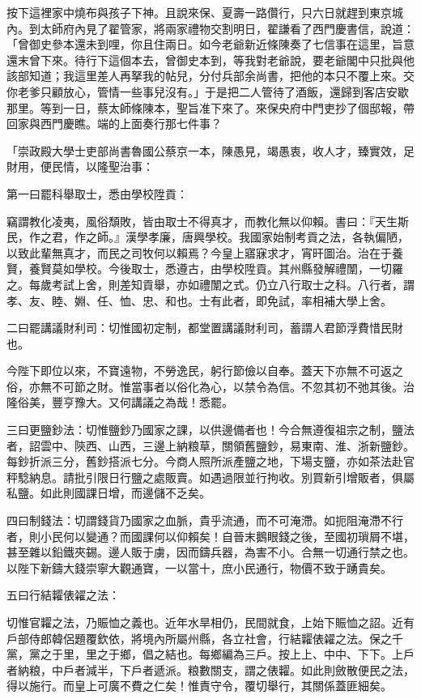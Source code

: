 \begin{showcontents}{}
按下這裡家中燒布與孩子下神。且說來保、夏壽一路儹行，只六日就趕到東京城內。到太師府內見了翟管家，將兩家禮物交割明日，翟謙看了西門慶書信，說道：「曾御史參本還未到哩，你且住兩日。如今老爺新近條陳奏了七信事在這里，旨意還末曾下來。待行下這個本去，曾御史本到，等我對老爺說，要老爺閣中只批與他該部知道；我這里差人再拏我的帖兒，分付兵部余尚書，把他的本只不覆上來。交你老爹只顧放心，管情一些事兒沒有。」于是把二人管待了酒飯，還歸到客店安歇那里。等到一日，蔡太師條陳本，聖旨准下來了。來保央府中門吏抄了個邸報，帶回家與西門慶瞧。端的上面奏行那七件事？

「崇政殿大學士吏部尚書魯國公蔡京一本，陳愚見，竭愚衷，收人才，臻實效，足財用，便民情，以隆聖治事：

第一曰罷科舉取士，悉由學校陞貢：

竊謂教化凌夷，風俗頹敗，皆由取士不得真才，而教化無以仰賴。書曰：『天生斯民，作之君，作之師。』漢學孝廉，唐興學校。我國家始制考貢之法，各執偏陋，以致此輩無真才，而民之司牧何以賴焉？今皇上寤寐求才，宵旰圖治。治在于養賢，養賢莫如學校。今後取士，悉遵古，由學校陞貢。其州縣發解禮闈，一切羅之。每歲考試上舍，則差知貢舉，亦如禮闈之式。仍立八行取士之科。八行者，謂孝、友、睦、婣、任、恤、忠、和也。士有此者，即免試，率相補大學上舍。

二曰罷講議財利司：切惟國初定制，都堂置講議財利司，蓄謂人君節浮費惜民財也。

今陛下即位以來，不寶遠物，不勞逸民，躬行節儉以自奉。蓋天下亦無不可返之俗，亦無不可節之財。惟當事者以俗化為心，以禁令為信。不忽其初不弛其後。治隆俗美，豐亨豫大。又何講議之為哉！悉罷。

三曰更鹽鈔法：切惟鹽鈔乃國家之課，以供邊備者也！今合無遵復祖宗之制，鹽法者，詔雲中、陝西、山西，三邊上納粮草，關領舊鹽鈔，易東南、淮、浙新鹽鈔。每鈔折派三分，舊鈔搭派七分。今商人照所派產鹽之地，下場支鹽，亦如茶法赴官秤騐納息。請批引限日行鹽之處販賣。如遇過限並行拘收。別買新引增販者，俱屬私鹽。如此則國課日增，而邊儲不乏矣。

四曰制錢法：切謂錢貨乃國家之血脈，貴乎流通，而不可淹滯。如扼阻淹滯不行者，則小民何以變通？而國課何以仰賴矣！自晉末鵝眼錢之後，至國初瑣屑不堪，甚至雜以鉛鐵夾錫。邊人販于虜，因而鑄兵器，為害不小。合無一切通行禁之也。以陛下新鑄大錢崇寧大觀通寶，一以當十，庶小民通行，物價不致于踴貴矣。

五曰行結糶俵糴之法：

切惟官糶之法，乃賑恤之義也。近年水旱相仍，民間就食，上始下賑恤之詔。近有戶部侍郎韓侶題覆欽依，將境內所屬州縣，各立社會，行結糶俵糴之法。保之千黨，黨之于里，里之于鄉，倡之結也。每鄉編為三戶。按上上、中中、下下。上戶者納粮，中戶者減半，下戶者遞派。粮數關支，謂之俵糶。如此則斂散便民之法，得以施行。而皇上可廣不費之仁矣！惟責守令，覆切舉行，其關係蓋匪細矣。


\end{showcontents}

